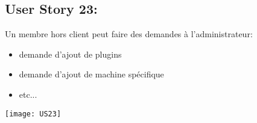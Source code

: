 \newpage{}
\subsection{User Story 23:}
Un membre hors client peut faire des demandes à l'administrateur:

\begin{itemize}
  \item demande d'ajout de plugins
  \item demande d'ajout de machine spécifique
  \item etc...
\end{itemize}



  \begin{center}
        \texttt{[image: US23]}
  \end{center}